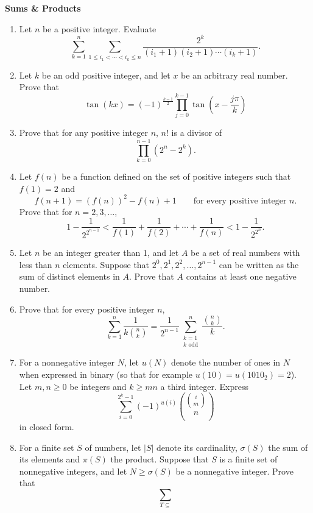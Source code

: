 \documentclass[12pt]{article}
\begin{document}
\pagestyle{fancy}
\setlength{\headheight}{15.2pt}




{\bfseries \Large Sums \& Products}


\begin{enumerate}

\item Let $n$ be a positive integer.
  Evaluate \[\sum_{k=1}^n\sum_{1\leq i_1<\cdots<i_k\leq n}\frac {2^k}{(i_1+1)(i_2+1)\cdots(i_k+1)}.\]
\item Let $k$ be an odd positive integer, and let $x$ be an arbitrary
  real number.  Prove that \[\tan(kx) =
  (-1)^{\frac{k-1}2}\prod_{j=0}^{k-1}\tan\left(x-\frac {j\pi} k\right)\]
\item Prove that for any positive integer $n$, $n!$ is a divisor of \[\prod_{k=0}^{n-1}(2^n-2^k).\]
\item Let $f(n)$ be a function defined on the set of positive integers
  such that $f(1)=2$ and \[f(n+1) = (f(n))^2-f(n)+1\qquad\textrm{for
    every positive integer } n.\]  Prove that for
  $n=2,3,\ldots$, \[1-\frac 1{2^{2^{n-1}}}<\frac 1{f(1)}+\frac
  1{f(2)}+\cdots+\frac 1{f(n)}<1-\frac 1{2^{2^n}}.\]
\item Let $n$ be an integer greater than 1, and let $A$ be a set of
  real numbers with less than $n$ elements.  Suppose that
  $2^0,2^1,2^2,\ldots,2^{n-1}$ can be written as the sum of distinct
  elements in $A$.  Prove that $A$ contains at least one negative
  number.
\item Prove that for every positive integer $n$, \[\sum_{k=1}^n\frac
  1{k\binom nk} = \frac 1{2^{n-1}}\sum_{\substack{k=1 \\ k \textrm{ odd}}}^n
  \frac{\binom nk}k.\]
\item For a nonnegative integer $N$, let $u(N)$ denote the number of
  ones in $N$ when expressed in binary (so that for example
  $u(10)=u(1010_2)=2$).  Let $m,n\geq 0$ be integers and $k\geq mn$ a
  third integer.  Express \[\sum_{i=0}^{2^k-1}(-1)^{u(i)}\binom{\binom
    im}n\] in closed form.
\item For a finite set $S$ of numbers, let $|S|$ denote its cardinality,
  $\sigma(S)$ the sum of its
  elements and $\pi(S)$ the product.  Suppose that $S$ is a finite set
  of nonnegative integers, and let $N\geq\sigma(S)$ be a nonnegative integer.  Prove that \[\sum_{T\subseteq
}\]
\end{enumerate}
\end{document}
